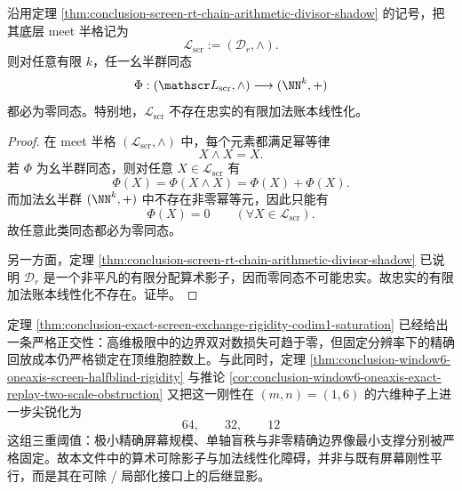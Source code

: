 \begin{theorem}[精确屏幕算术影子的加法线性化障碍]\label{thm:conclusion-screen-arithmetic-shadow-additive-linearization-obstruction}
沿用定理 \ref{thm:conclusion-screen-rt-chain-arithmetic-divisor-shadow} 的记号，把其底层 meet 半格记为
\[
\mathscr L_{\mathrm{scr}}:=(\mathscr D_r,\wedge).
\]
则对任意有限 \(k\)，任一幺半群同态
\[
\Phi:(\mathscr L_{\mathrm{scr}},\wedge)\longrightarrow (\NN^k,+)
\]
都必为零同态。特别地，\(\mathscr L_{\mathrm{scr}}\) 不存在忠实的有限加法账本线性化。
\end{theorem}
\begin{proof}
在 meet 半格 \((\mathscr L_{\mathrm{scr}},\wedge)\) 中，每个元素都满足幂等律
\[
X\wedge X=X.
\]
若 \(\Phi\) 为幺半群同态，则对任意 \(X\in \mathscr L_{\mathrm{scr}}\) 有
\[
\Phi(X)=\Phi(X\wedge X)=\Phi(X)+\Phi(X).
\]
而加法幺半群 \((\NN^k,+)\) 中不存在非零幂等元，因此只能有
\[
\Phi(X)=0
\qquad
(\forall X\in \mathscr L_{\mathrm{scr}}).
\]
故任意此类同态都必为零同态。

另一方面，定理 \ref{thm:conclusion-screen-rt-chain-arithmetic-divisor-shadow} 已说明 \(\mathscr D_r\) 是一个非平凡的有限分配算术影子，因而零同态不可能忠实。故忠实的有限加法账本线性化不存在。证毕。
\end{proof}

\begin{remark}[与全息饱和和六维种子的接口]\label{rem:conclusion-screen-divisibility-globalization-bridge-existing-anchors}
定理 \ref{thm:conclusion-exact-screen-exchange-rigidity-codim1-saturation} 已经给出一条严格正交性：高维极限中的边界双对数损失可趋于零，但固定分辨率下的精确回放成本仍严格锁定在顶维胞腔数上。与此同时，定理 \ref{thm:conclusion-window6-oneaxis-screen-halfblind-rigidity} 与推论 \ref{cor:conclusion-window6-oneaxis-exact-replay-two-scale-obstruction} 又把这一刚性在 \((m,n)=(1,6)\) 的六维种子上进一步尖锐化为
\[
64,\qquad 32,\qquad 12
\]
这组三重阈值：极小精确屏幕规模、单轴盲秩与非零精确边界像最小支撑分别被严格固定。故本文件中的算术可除影子与加法线性化障碍，并非与既有屏幕刚性平行，而是其在可除 / 局部化接口上的后继显影。
\end{remark}

